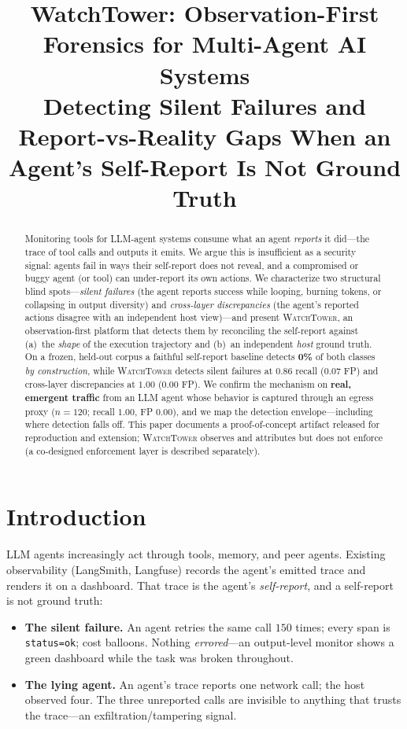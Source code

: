 \documentclass[conference]{IEEEtran}
\title{WatchTower: Observation-First Forensics for Multi-Agent AI Systems\\
\large Detecting Silent Failures and Report-vs-Reality Gaps When an
Agent's Self-Report Is Not Ground Truth}
\author{\IEEEauthorblockN{Rohit Jinsiwale}
\IEEEauthorblockA{Proof-of-Concept Artifact\\
\url{https://github.com/beejak/agentwatch}}}
\begin{document}
\maketitle

\begin{abstract}
Monitoring tools for LLM-agent systems consume what an agent \emph{reports} it did---the
trace of tool calls and outputs it emits. We argue this is insufficient as a security signal:
agents fail in ways their self-report does not reveal, and a compromised or buggy agent (or
tool) can under-report its own actions. We characterize two structural blind spots---\emph{silent
failures} (the agent reports success while looping, burning tokens, or collapsing in output
diversity) and \emph{cross-layer discrepancies} (the agent's reported actions disagree with an
independent host view)---and present \textsc{WatchTower}, an observation-first platform that
detects them by reconciling the self-report against (a)~the \emph{shape} of the execution
trajectory and (b)~an independent \emph{host} ground truth. On a frozen, held-out corpus a
faithful self-report baseline detects \textbf{0\%} of both classes \emph{by construction},
while \textsc{WatchTower} detects silent failures at $0.86$ recall ($0.07$ FP) and cross-layer
discrepancies at $1.00$ ($0.00$ FP). We confirm the mechanism on \textbf{real, emergent
traffic} from an LLM agent whose behavior is captured through an egress proxy ($n{=}120$;
recall $1.00$, FP $0.00$), and we map the detection envelope---including where detection falls
off. This paper documents a proof-of-concept artifact released for reproduction and extension;
\textsc{WatchTower} observes and attributes but does not enforce (a co-designed enforcement
layer is described separately).
\end{abstract}

\section{Introduction}
LLM agents increasingly act through tools, memory, and peer agents. Existing observability
(LangSmith, Langfuse) records the agent's emitted trace and renders it on a dashboard. That
trace is the agent's \emph{self-report}, and a self-report is not ground truth:

\begin{itemize}
\item \textbf{The silent failure.} An agent retries the same call $150$ times; every span is
\texttt{status=ok}; cost balloons. Nothing \emph{errored}---an output-level monitor shows a
green dashboard while the task was broken throughout.
\item \textbf{The lying agent.} An agent's trace reports one network call; the host observed
four. The three unreported calls are invisible to anything that trusts the trace---an
exfiltration/tampering signal.
\end{itemize}
\end{document}
